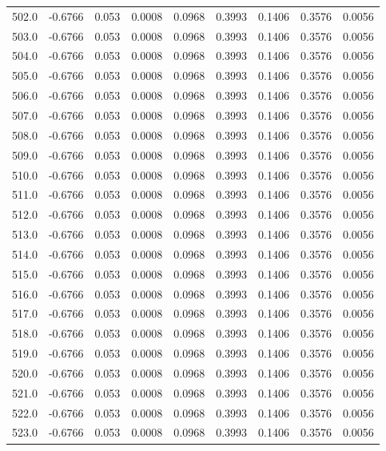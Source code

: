 \begin{longtable}{lrrrrrrrr}
502.0 & -0.6766 & 0.053 & 0.0008 & 0.0968 & 0.3993 & 0.1406 & 0.3576 & 0.0056 \\
503.0 & -0.6766 & 0.053 & 0.0008 & 0.0968 & 0.3993 & 0.1406 & 0.3576 & 0.0056 \\
504.0 & -0.6766 & 0.053 & 0.0008 & 0.0968 & 0.3993 & 0.1406 & 0.3576 & 0.0056 \\
505.0 & -0.6766 & 0.053 & 0.0008 & 0.0968 & 0.3993 & 0.1406 & 0.3576 & 0.0056 \\
506.0 & -0.6766 & 0.053 & 0.0008 & 0.0968 & 0.3993 & 0.1406 & 0.3576 & 0.0056 \\
507.0 & -0.6766 & 0.053 & 0.0008 & 0.0968 & 0.3993 & 0.1406 & 0.3576 & 0.0056 \\
508.0 & -0.6766 & 0.053 & 0.0008 & 0.0968 & 0.3993 & 0.1406 & 0.3576 & 0.0056 \\
509.0 & -0.6766 & 0.053 & 0.0008 & 0.0968 & 0.3993 & 0.1406 & 0.3576 & 0.0056 \\
510.0 & -0.6766 & 0.053 & 0.0008 & 0.0968 & 0.3993 & 0.1406 & 0.3576 & 0.0056 \\
511.0 & -0.6766 & 0.053 & 0.0008 & 0.0968 & 0.3993 & 0.1406 & 0.3576 & 0.0056 \\
512.0 & -0.6766 & 0.053 & 0.0008 & 0.0968 & 0.3993 & 0.1406 & 0.3576 & 0.0056 \\
513.0 & -0.6766 & 0.053 & 0.0008 & 0.0968 & 0.3993 & 0.1406 & 0.3576 & 0.0056 \\
514.0 & -0.6766 & 0.053 & 0.0008 & 0.0968 & 0.3993 & 0.1406 & 0.3576 & 0.0056 \\
515.0 & -0.6766 & 0.053 & 0.0008 & 0.0968 & 0.3993 & 0.1406 & 0.3576 & 0.0056 \\
516.0 & -0.6766 & 0.053 & 0.0008 & 0.0968 & 0.3993 & 0.1406 & 0.3576 & 0.0056 \\
517.0 & -0.6766 & 0.053 & 0.0008 & 0.0968 & 0.3993 & 0.1406 & 0.3576 & 0.0056 \\
518.0 & -0.6766 & 0.053 & 0.0008 & 0.0968 & 0.3993 & 0.1406 & 0.3576 & 0.0056 \\
519.0 & -0.6766 & 0.053 & 0.0008 & 0.0968 & 0.3993 & 0.1406 & 0.3576 & 0.0056 \\
520.0 & -0.6766 & 0.053 & 0.0008 & 0.0968 & 0.3993 & 0.1406 & 0.3576 & 0.0056 \\
521.0 & -0.6766 & 0.053 & 0.0008 & 0.0968 & 0.3993 & 0.1406 & 0.3576 & 0.0056 \\
522.0 & -0.6766 & 0.053 & 0.0008 & 0.0968 & 0.3993 & 0.1406 & 0.3576 & 0.0056 \\
523.0 & -0.6766 & 0.053 & 0.0008 & 0.0968 & 0.3993 & 0.1406 & 0.3576 & 0.0056 \\

\end{longtable}
